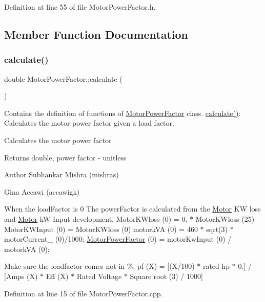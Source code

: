 Definition at line 55 of file Motor\+Power\+Factor.\+h.



\subsection{Member Function Documentation}
\mbox{\label{class_motor_power_factor_ac9d5742db4a371bc4e15d5b29d335b6e}} 
\subsubsection{\texorpdfstring{calculate()}{calculate()}}
{\footnotesize\ttfamily double Motor\+Power\+Factor\+::calculate (\begin{DoxyParamCaption}{ }\end{DoxyParamCaption})}



Contains the definition of functions of \hyperlink{class_motor_power_factor}{Motor\+Power\+Factor} class. \hyperlink{class_motor_power_factor_ac9d5742db4a371bc4e15d5b29d335b6e}{calculate()}\+: Calculates the motor power factor given a load factor. 

Calculates the motor power factor \begin{DoxyReturn}{Returns}
double, power factor -\/ unitless
\end{DoxyReturn}
\begin{DoxyAuthor}{Author}
Subhankar Mishra (mishras) 

Gina Accawi (accawigk) 
\end{DoxyAuthor}
When the load\+Factor is 0 The power\+Factor is calculated from the \hyperlink{class_motor}{Motor} KW loss and \hyperlink{class_motor}{Motor} kW Input development. Motor\+K\+Wloss (0) = 0. $\ast$ Motor\+K\+Wloss (25) Motor\+K\+W\+Input (0) = Motor\+K\+Wloss (0) motork\+VA (0) = 460 $\ast$ sqrt(3) $\ast$ motor\+Current\+\_\+ (0)/1000; \hyperlink{class_motor_power_factor}{Motor\+Power\+Factor} (0) = motor\+Kw\+Input (0) / motork\+VA (0);

Make sure the loadfactor comes not in \%. pf (X) = \mbox{[}(X/100) $\ast$ rated hp $\ast$ 0.\mbox{]} / \mbox{[}Amps (X) $\ast$ Eff (X) $\ast$ Rated Voltage $\ast$ Square root (3) / 1000\mbox{]}

Definition at line 15 of file Motor\+Power\+Factor.\+cpp.

